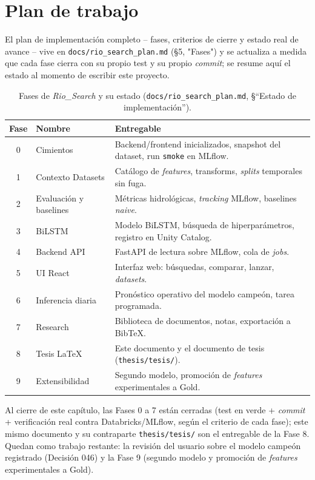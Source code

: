 \chapter{Plan de trabajo}
\label{sec:plan-trabajo}

El plan de implementaci\'on completo -- fases, criterios de cierre y estado real de avance -- vive
en \texttt{docs/rio\_search\_plan.md} (\S5, "Fases") y se actualiza a medida que cada fase cierra
con su propio test y su propio \emph{commit}; se resume aqu\'i el estado al momento de escribir
este proyecto.

\begin{table}[H]
\centering
\caption{Fases de \emph{Rio\_Search} y su estado (\texttt{docs/rio\_search\_plan.md}, \S ``Estado
de implementaci\'on'').}
\begin{tabular}{clp{7.5cm}}
\toprule
Fase & Nombre & Entregable \\
\midrule
0 & Cimientos & Backend/frontend inicializados, snapshot del dataset, run \texttt{smoke} en MLflow. \\
1 & Contexto Datasets & Cat\'alogo de \emph{features}, transforms, \emph{splits} temporales sin fuga. \\
2 & Evaluaci\'on y baselines & M\'etricas hidrol\'ogicas, \emph{tracking} MLflow, baselines \emph{naive}. \\
3 & BiLSTM & Modelo BiLSTM, b\'usqueda de hiperpar\'ametros, registro en Unity Catalog. \\
4 & Backend API & FastAPI de lectura sobre MLflow, cola de \emph{jobs}. \\
5 & UI React & Interfaz web: b\'usquedas, comparar, lanzar, \emph{datasets}. \\
6 & Inferencia diaria & Pron\'ostico operativo del modelo campe\'on, tarea programada. \\
7 & Research & Biblioteca de documentos, notas, exportaci\'on a BibTeX. \\
8 & Tesis LaTeX & Este documento y el documento de tesis (\texttt{thesis/tesis/}). \\
9 & Extensibilidad & Segundo modelo, promoci\'on de \emph{features} experimentales a Gold. \\
\bottomrule
\end{tabular}
\end{table}

Al cierre de este cap\'itulo, las Fases 0 a 7 est\'an cerradas (test en verde + \emph{commit} +
verificaci\'on real contra Databricks/MLflow, seg\'un el criterio de cada fase); este mismo
documento y su contraparte \texttt{thesis/tesis/} son el entregable de la Fase 8. Quedan como
trabajo restante: la revisi\'on del usuario sobre el modelo campe\'on registrado (Decisi\'on 046) y
la Fase 9 (segundo modelo y promoci\'on de \emph{features} experimentales a Gold).
